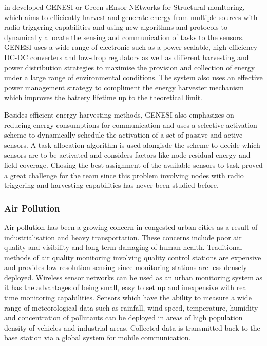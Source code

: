 \citeauthor{5508230} in \cite{5508230} developed GENESI or Green sEnsor NEtworks for Structural monItoring, which aims to efficiently harvest and generate energy from multiple-sources with radio triggering capabilities and using new algorithms and protocols to dynamically allocate the sensing and communication of tasks to the sensors. GENESI uses a wide range of electronic such as a power-scalable, high efficiency  DC-DC converters and low-drop regulators as well as different harvesting and power distribution strategies to maximise the provision and collection of energy under a large range of environmental conditions. The system also uses an effective power management strategy to compliment the energy harvester mechanism which improves the battery lifetime up to the theoretical limit.

Besides efficient energy harvesting methods, GENESI also emphasizes on reducing energy consumptions for communication and uses a selective activation scheme to dynamically schedule the activation of a set of passive and active sensors. A task allocation algorithm is used alongisde the scheme to decide which sensors are to be activated and considers factors like node residual energy and field coverage. Chosing the best assignment of the available sensors to task proved a great challenge for the team since this problem involving nodes with radio triggering and harvesting capabilities has never been studied before.


\subsubsection*{Air Pollution}
\cite{libeliumAirPollution}
\cite{wsnpollution} 

\cite{fotuewsnpollution}

Air pollution has been a growing concern in congested urban cities as a result of industrialisation and heavy transportation. These concerns include poor air quality and visibility and long term damaging of human health. Traditional methods of air quality monitoring involving quality control stations are expensive and provides low resolution sensing since monitoring stations are less densely deployed. Wireless sensor networks can be used as an urban monitoring system as it has the advantages of being small, easy to set up and inexpensive with real time monitoring capabilities. Sensors which have the ability to measure a wide range of meteorological data such as rainfall, wind speed, temperature, humidity and concentration of pollutants can be deployed in areas of high population density of vehicles and industrial areas. Collected data is transmitted back to the base station via a global system for mobile communication.

